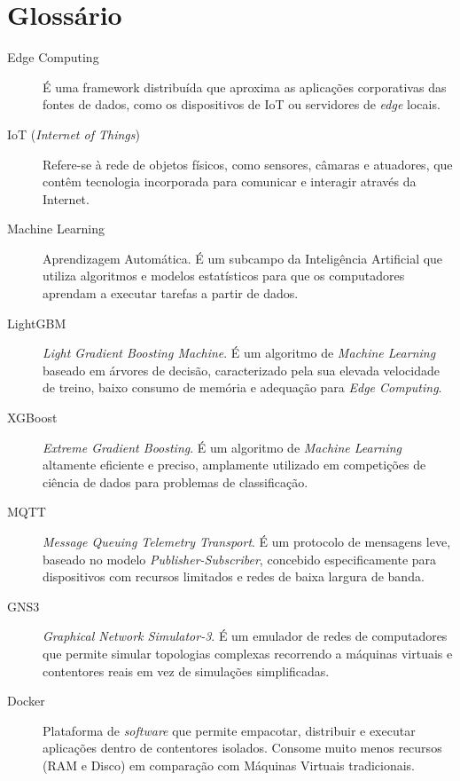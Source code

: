 \chapter*{Glossário}

\begin{description}

    \item[Edge Computing] É uma framework distribuída que aproxima as aplicações
    corporativas das fontes de dados, como os dispositivos de IoT ou
    servidores de \textit{edge} locais.

    \item[IoT (\textit{Internet of Things})] Refere-se à rede de objetos físicos, como sensores, câmaras e atuadores, que contêm tecnologia incorporada para comunicar e interagir através da Internet.

    \item[Machine Learning] Aprendizagem Automática. É um subcampo da Inteligência Artificial que utiliza algoritmos e modelos estatísticos para que os computadores aprendam a executar tarefas a partir de dados.

    \item[LightGBM] \textit{Light Gradient Boosting Machine}. É um algoritmo de \textit{Machine Learning} baseado em árvores de decisão, caracterizado pela sua elevada velocidade de treino, baixo consumo de memória e adequação para \textit{Edge Computing}.

    \item[XGBoost] \textit{Extreme Gradient Boosting}. É um algoritmo de \textit{Machine Learning} altamente eficiente e preciso, amplamente utilizado em competições de ciência de dados para problemas de classificação.

    \item[MQTT] \textit{Message Queuing Telemetry Transport}. É um protocolo de mensagens leve, baseado no modelo \textit{Publisher-Subscriber}, concebido especificamente para dispositivos com recursos limitados e redes de baixa largura de banda.

    \item[GNS3] \textit{Graphical Network Simulator-3}. É um emulador de redes de computadores que permite simular topologias complexas recorrendo a máquinas virtuais e contentores reais em vez de simulações simplificadas.

    \item[Docker] Plataforma de \textit{software} que permite empacotar, distribuir e executar aplicações dentro de contentores isolados. Consome muito menos recursos (RAM e Disco) em comparação com Máquinas Virtuais tradicionais.


\end{description}
